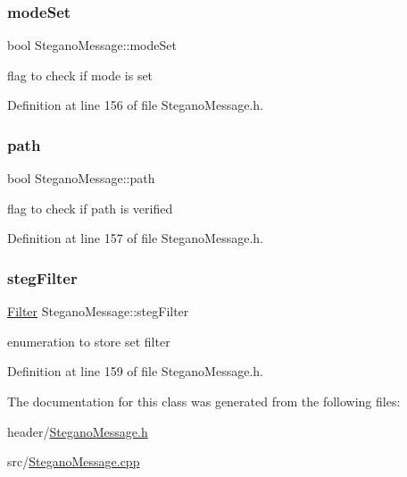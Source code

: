 \mbox{\label{classSteganoMessage_ae1da17c621a8db71fa4eb3b148a82ceb}} 
\subsubsection{\texorpdfstring{modeSet}{modeSet}}
{\footnotesize\ttfamily bool Stegano\+Message\+::mode\+Set\hspace{0.3cm}{\ttfamily [private]}}

flag to check if mode is set 

Definition at line 156 of file Stegano\+Message.\+h.

\mbox{\label{classSteganoMessage_a399f4c181d3b7b15ccdb5c925a7a1f51}} 
\subsubsection{\texorpdfstring{path}{path}}
{\footnotesize\ttfamily bool Stegano\+Message\+::path\hspace{0.3cm}{\ttfamily [private]}}

flag to check if path is verified 

Definition at line 157 of file Stegano\+Message.\+h.

\mbox{\label{classSteganoMessage_ab0cca34d0f02f406733e62a477bb15be}} 
\subsubsection{\texorpdfstring{stegFilter}{stegFilter}}
{\footnotesize\ttfamily \mbox{\hyperlink{constants_8h_adccf6e8a392b0d35f185df12521c474b}{Filter}} Stegano\+Message\+::steg\+Filter\hspace{0.3cm}{\ttfamily [private]}}

enumeration to store set filter 

Definition at line 159 of file Stegano\+Message.\+h.



The documentation for this class was generated from the following files\+:\begin{DoxyCompactItemize}
\item 
header/\mbox{\hyperlink{SteganoMessage_8h}{Stegano\+Message.\+h}}\item 
src/\mbox{\hyperlink{SteganoMessage_8cpp}{Stegano\+Message.\+cpp}}\end{DoxyCompactItemize}
